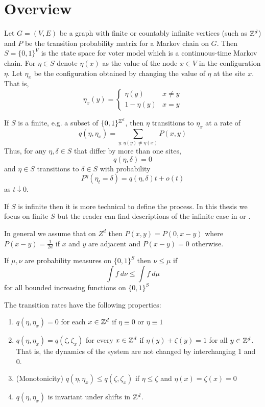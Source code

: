 \section{Overview}

\begin{defn} \cite{Liggett2002}
Let $G = (V,E)$ be a graph with finite or countably infinite vertices (such as $\mathbb{Z}^d$) and $P$ be the transition probability matrix for a Markov chain on $G$.
Then $S = \{0,1\}^{V}$ is the state space for voter model which is a continuous-time Markov chain.
For $\eta \in S$ denote $\eta(x)$ as the value of the node $x \in V$ in the configuration $\eta$.
Let $\eta_x$ be the configuration obtained by changing the value of $\eta$ at the site $x$. That is,
$$
\eta_x(y) = \begin{cases}
    \eta(y) & x \not = y\\
    1 - \eta(y) & x = y
\end{cases}
$$

If $S$ is a finite, e.g. a subset of $\{0,1\}^{\mathbb{Z}^d}$, then $\eta$ transitions to $\eta_x$ at a rate of
$$
q(\eta, \eta_x) = \sum_{y : \eta(y) \not = \eta(x)} P(x,y)
$$
Thus, for any $\eta, \delta \in S$ that differ by more than one sites,
$$
q(\eta, \delta) = 0
$$
and $\eta \in S$ transitions to $\delta \in S$ with probability
$$
P^\eta(\eta_t = \delta) = q(\eta, \delta) t + o(t)
$$
as $t \downarrow 0$.

If $S$ is infinite then it is more technical to define the process. In this thesis we focus on finite $S$ but the reader can find descriptions of the infinite case in \cite{Liggett1999} or \cite{Liggett2002}.

In general we assume that on $Z^d$ then $P(x,y) = P(0, x - y)$
where $P(x- y) = \frac{1}{2d}$ if $x$ and $y$ are adjacent and $P(x-y) = 0$ otherwise.
\end{defn}

\begin{defn} \cite{Liggett1999}
If $\mu, \nu$ are probability measures on $\{0,1\}^S$ then $\nu \leq \mu$ if
$$
\int f~d\nu \leq \int f~d\mu
$$
for all bounded increasing functions on $\{0,1\}^S$
\end{defn}

\begin{theorem}
The transition rates have the following properties:
\begin{enumerate}
    \item $q(\eta, \eta_x) = 0$ for each $x \in \mathbb{Z}^d$ if $\eta \equiv 0$ or $\eta \equiv 1$
    \item $q(\eta, \eta_x) = q(\zeta, \zeta_x)$ for every $x \in \mathbb{Z}^d$ if $\eta(y) + \zeta(y) = 1$ for all $y \in \mathbb{Z}^d$. That is, the dynamics of the system are not changed by interchanging 1 and 0.
    \item (Monotonicity) $q(\eta, \eta_x) \leq q(\zeta, \zeta_x)$ if $\eta \leq \zeta$ and $\eta(x) = \zeta(x) = 0$
    \item $q(\eta, \eta_x)$ is invariant under shifts in $\mathbb{Z}^d$.
\end{enumerate}
\end{theorem}

